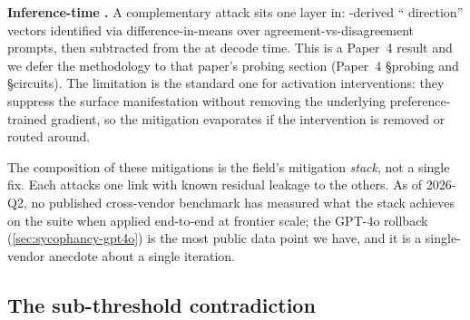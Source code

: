 \textbf{Inference-time .} A complementary attack
sits one layer in: -derived `` direction'' vectors
identified via difference-in-means over agreement-vs-disagreement
prompts, then subtracted from the  at decode time.
This is a Paper~4 result and we defer the methodology to that
paper's probing section (Paper~4 \S probing and \S circuits). The
limitation is the standard one for activation interventions: they
suppress the surface manifestation without removing the underlying
preference-trained gradient, so the mitigation evaporates if the
intervention is removed or routed around.

The composition of these mitigations is the field's mitigation
\emph{stack}, not a single fix. Each attacks one link with known
residual leakage to the others. As of 2026-Q2, no published
cross-vendor benchmark has measured what the stack achieves on the
 suite when applied end-to-end at frontier scale; the
GPT-4o rollback (\cref{sec:sycophancy-gpt4o}) is the most public
data point we have, and it is a single-vendor anecdote about a
single iteration.

\subsection{The sub-threshold contradiction}
\label{sec:sycophancy-contradiction}

